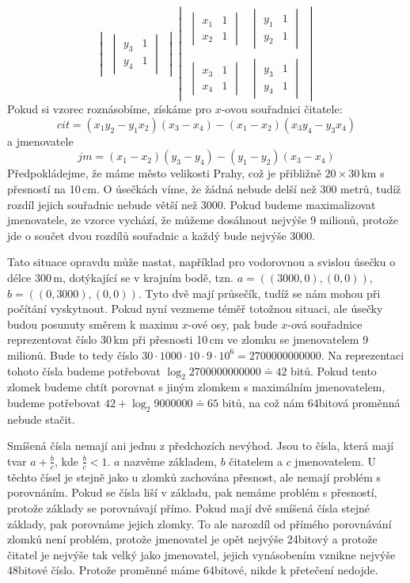 $${\begin{vmatrix}
		\begin{vmatrix} y_3 & 1\\y_4 & 1\end{vmatrix} 
	\end{vmatrix} 
}
{
	\begin{vmatrix}
		\begin{vmatrix} x_1 & 1\\x_2 & 1\end{vmatrix} &
		\begin{vmatrix} y_1 & 1\\y_2 & 1\end{vmatrix} \\\\
		\begin{vmatrix} x_3 & 1\\x_4 & 1\end{vmatrix} &
		\begin{vmatrix} y_3 & 1\\y_4 & 1\end{vmatrix} 
	\end{vmatrix}
}\,\!$$
Pokud si vzorec roznásobíme, získáme pro $x$-ovou souřadnici čitatele:
$$
{cit = (x_1 y_2-y_1 x_2)(x_3-x_4)-(x_1-x_2)(x_3 y_4-y_3 x_4)}
$$ a jmenovatele $$
{jm = (x_1-x_2)(y_3-y_4)-(y_1-y_2)(x_3-x_4)}$$
Předpokládejme, že máme město velikosti Prahy, což je přibližně $20 \times
30$\,km s přesností na 10\,cm. O úsečkách víme, že žádná nebude delší než 300
metrů, tudíž rozdíl jejich souřadnic nebude větší než 3000. Pokud budeme
maximalizovat jmenovatele, ze vzorce vychází, že můžeme dosáhnout nejvýše 9
milionů, protože jde o součet dvou rozdílů souřadnic a každý bude nejvýše 3000.

Tato situace opravdu může nastat, například pro vodorovnou a svislou úsečku o
délce 300\,m, dotýkající se v krajním bodě, tzn. $a=((3000,0),(0,0))$,
$b=((0,3000),(0,0))$. Tyto dvě mají průsečík, tudíž se nám mohou při počítání
vyskytnout. Pokud nyní vezmeme téměř totožnou situaci, ale úsečky budou posunuty
směrem k maximu $x$-ové osy, pak bude $x$-ová souřadnice reprezentovat číslo
30\,km při přesnosti 10\,cm ve zlomku se jmenovatelem 9 milionů. Bude to tedy
číslo $30\cdot1000\cdot10\cdot9\cdot10^6=2700000000000$. Na reprezentaci tohoto
čísla budeme potřebovat $\log_2 2700000000000 \doteq 42$ bitů. Pokud tento
zlomek budeme chtít porovnat s jiným zlomkem s maximálním jmenovatelem, budeme
potřebovat $42 + \log_2 9000000 \doteq 65$ bitů, na což nám 64bitová proměnná
nebude stačit.

{\tuc Smíšená čísla} nemají ani jednu z předchozích nevýhod. Jsou to čísla,
která mají tvar $a+\frac{b}{c}$, kde $\frac{b}{c}<1$. $a$ nazvěme základem, $b$
čitatelem a $c$ jmenovatelem. U těchto čísel je stejně jako u zlomků zachována
přesnost, ale nemají problém s porovnáním. Pokud se čísla liší v základu, pak
nemáme problém s přesností, protože základy se porovnávají přímo. Pokud mají dvě
smíšená čísla stejné základy, pak porovnáme jejich zlomky. To ale narozdíl od
přímého porovnávání zlomků není problém, protože jmenovatel je opět nejvýše
24bitový a protože čitatel je nejvýše tak velký jako jmenovatel, jejich
vynásobením vznikne nejvýše 48bitové číslo. Protože proměnné máme 64bitové,
nikde k přetečení nedojde.

